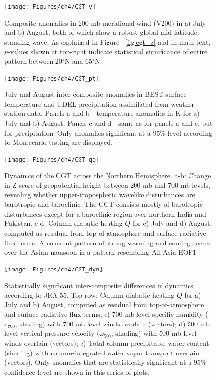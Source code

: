 \begin{figure}
\centering
\noindent\texttt{[image: Figures/ch4/CGT\_v]}
\caption{Composite anomalies in 200-mb meridional wind (V200) in a) July and b) August, both of which show a robust global mid-latitude standing wave. As explained in Figure ~\ref{fig:cgt_z} and in main text, $p$-values shown at top-right indicate statistical significance of entire pattern between 20$^{\circ}$N and 65$^{\circ}$N.}
\label{fig:cgt_v}
\end{figure}

\begin{figure}
\centering
\noindent\texttt{[image: Figures/ch4/CGT\_pt]}
\caption{July and August inter-composite anomalies in BEST surface temperature and UDEL precipitation assimilated from weather station data. Panels a and b - temperature anomalies in K for a) July and b) August. Panels c and d - same as for panels a and c, but for precipitation. Only anomalies significant at a 95\% level according to Montecarlo testing are displayed.}
\label{fig:cgt_pt}
\end{figure}

\begin{figure}
\centering
\noindent\texttt{[image: Figures/ch4/CGT\_qq]}
\caption{Dynamics of the CGT across the Northern Hemisphere. a-b: Change in Z-score of geopotential height between 200-mb and 700-mb levels, revealing whether upper-tropospheric wavelike disturbances are barotropic and baroclinic. The CGT consists mostly of barotropic disturbances except for a baroclinic region over northern India and Pakistan. c-d: Column diabatic heating $Q$ for c) July and d) August, computed as residual from top-of-atmosphere and surface radiative flux terms. A coherent pattern of strong warming and cooling occurs over the Asian monsoon in a pattern resembling All-Asia EOF1}
\label{fig:cgt_dyn}
\end{figure}

\begin{figure}
\centering
\noindent\texttt{[image: Figures/ch4/CGT\_dyn]}
\caption{Statistically significant inter-composite differences in dynamics according to JRA-55. Top row: Column diabatic heating $Q$ for a) July and b) August, computed as residual from top-of-atmosphere and surface radiative flux terms; c) 700-mb level specific humidity ($e_{700}$, shading) with 700-mb level winds overlain (vectors); d) 500-mb level vertical pressure velocity ($\omega_{500}$, shading) with 500-mb level winds overlain (vectors); e) Total column precipitable water content (shading) with column-integrated water vapor transport overlain (vectors). Only anomalies that are statistically significant at a 95\% confidence level are shown in this series of plots.}
\label{fig:cgt_dyn}
\end{figure}

